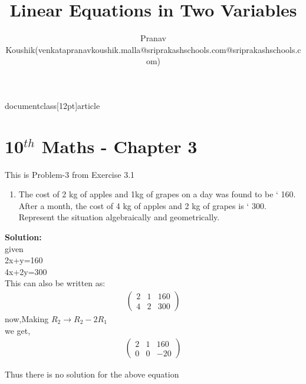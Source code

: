 documentclass[12pt]{article}
\usepackage{amsmath}
\newcommand{\myvec}[1]{\ensuremath{\begin{pmatrix}#1\end{pmatrix}}}
\newcommand{\mydet}[1]{\ensuremath{\begin{vmatrix}#1\end{vmatrix}}}
\newcommand{\solution}{\noindent \textbf{Solution: }}
\providecommand{\brak}[1]{\ensuremath{\left(#1\right)}}
\providecommand{\norm}[1]{\left\lVert#1\right\rVert}
\let\vec\mathbf
\title{Linear Equations in Two Variables}
\author{Pranav Koushik(venkatapranavkoushik.malla@sriprakashschools.com@sriprakashschools.com)}

\maketitle
\section*{10$^{th}$ Maths - Chapter 3}
This is Problem-3 from Exercise 3.1
\begin{enumerate}
\item The cost of 2 kg of apples and 1kg of grapes on a day was found to be ` 160. After a
month, the cost of 4 kg of apples and 2 kg of grapes is ` 300. Represent the situation
algebraically and geometrically.\\

\end{enumerate}
\solution\\
given\\
2x+y=160\\
4x+2y=300\\
This can also be written as:\\
\begin{align}
\myvec{2&1&160\\4&2&300}
\end{align}
now,Making $R_2 \xrightarrow\ R_2 - 2R_1$\\
we get,
\begin{align}
\myvec{2&1&160\\0&0&-20}
\end{align}
\begin{enumerate}
Thus there is no solution for the above equation\\
\end{enumerate}


